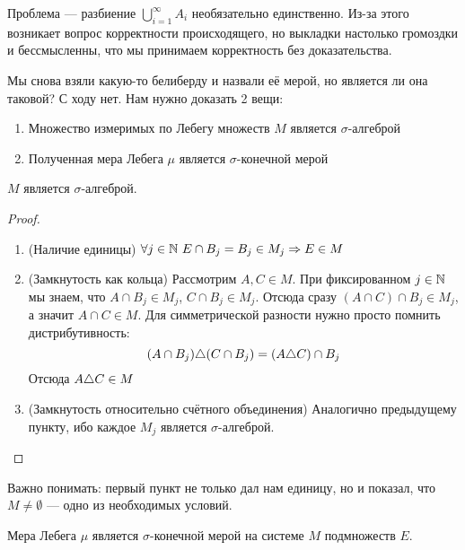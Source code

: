 \begin{note}
	Проблема --- разбиение $\bigcup_{i = 1}^\infty A_i$ необязательно единственно. Из-за этого возникает вопрос корректности происходящего, но выкладки настолько громоздки и бессмысленны, что мы принимаем корректность без доказательства.
\end{note}

\begin{note}
	Мы снова взяли какую-то белиберду и назвали её мерой, но является ли она таковой? С ходу нет. Нам нужно доказать 2 вещи:
	\begin{enumerate}
		\item Множество измеримых по Лебегу множеств $M$ является $\sigma$-алгеброй
		
		\item Полученная мера Лебега $\mu$ является $\sigma$-конечной мерой
	\end{enumerate}
\end{note}

\begin{theorem}
	$M$ является $\sigma$-алгеброй.
\end{theorem}

\begin{proof}~
	\begin{enumerate}
		\item (Наличие единицы) $\forall j \in \mathbb{N}\ E \cap B_j = B_j \in M_j \Rightarrow E \in M$
		
		\item (Замкнутость как кольца) Рассмотрим $A, C \in M$. При фиксированном $j \in \mathbb{N}$ мы знаем, что $A \cap B_j \in M_j$, $C \cap B_j \in M_j$. Отсюда сразу $(A \cap C) \cap B_j \in M_j$, а значит $A \cap C \in M$. Для симметрической разности нужно просто помнить дистрибутивность:
		\[
			(A \cap B_j) \triangle (C \cap B_j) = (A \triangle C) \cap B_j
		\]
		Отсюда $A \triangle C \in M$
		
		\item (Замкнутость относительно счётного объединения) Аналогично предыдущему пункту, ибо каждое $M_j$ является $\sigma$-алгеброй.
	\end{enumerate}
\end{proof}

\begin{note}
	Важно понимать: первый пункт не только дал нам единицу, но и показал, что $M \neq \emptyset$ --- одно из необходимых условий.
\end{note}

\begin{theorem}
	Мера Лебега $\mu$ является $\sigma$-конечной мерой на системе $M$ подмножеств $E$.
\end{theorem}

